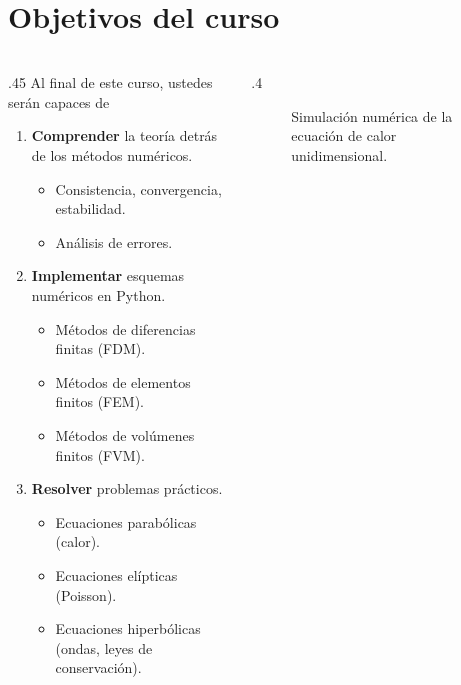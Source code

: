 \section{Objetivos del curso}

\begin{frame}
	\frametitle{\insertsection}

	\begin{columns}
		\begin{column}{.45\paperwidth}
			Al final de este curso, ustedes serán capaces de

			\begin{enumerate}
				\item \textbf{Comprender} la teoría detrás de los métodos numéricos.
				      \begin{itemize}
					      \item Consistencia, convergencia, estabilidad.
					      \item Análisis de errores.
				      \end{itemize}

				\item \textbf{Implementar} esquemas numéricos en Python.
				      \begin{itemize}
					      \item Métodos de diferencias finitas (FDM).
					      \item Métodos de elementos finitos (FEM).
					      \item Métodos de volúmenes finitos (FVM).
				      \end{itemize}

				\item \textbf{Resolver} problemas prácticos.
				      \begin{itemize}
					      \item Ecuaciones parabólicas (calor).
					      \item Ecuaciones elípticas (Poisson).
					      \item Ecuaciones hiperbólicas (ondas, leyes de conservación).
				      \end{itemize}
			\end{enumerate}
		\end{column}
		\begin{column}{.4\paperwidth}
			\begin{figure}[ht!]
				\centering
				\caption{Simulación numérica de la ecuación de calor unidimensional.}
				\label{fig:calor}
			\end{figure}
		\end{column}
	\end{columns}
\end{frame}
